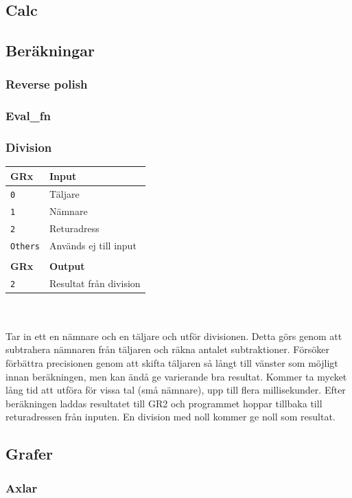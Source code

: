 \documentclass[]{article}
\begin{document}
\subsection{Calc}

\subsection{Beräkningar}
\subsubsection{Reverse polish}
\subsubsection{Eval\_fn}
\subsubsection{Division}
\begin{tabular}{ll}
	\textbf{GRx}    & \textbf{Input}         \\ \hline
	\texttt{0}      & Täljare                \\
	\texttt{1}      & Nämnare                \\
	\texttt{2}      & Returadress            \\
	\texttt{Others} & Används ej till input  \\
	                &  \\
	\textbf{GRx}    & \textbf{Output}        \\ \hline
	\texttt{2}      & Resultat från division
\end{tabular}
\\\\
\noindent
Tar in ett en nämnare och en täljare och utför divisionen. Detta görs genom att subtrahera nämnaren från täljaren och räkna antalet subtraktioner. Försöker förbättra precisionen genom att skifta täljaren så långt till vänster som möjligt innan beräkningen, men kan ändå ge varierande bra resultat. Kommer ta mycket lång tid att utföra för vissa tal (små nämnare), upp till flera millisekunder. Efter beräkningen laddas resultatet till GR2 och programmet hoppar tillbaka till returadressen från inputen. En division med noll kommer ge noll som resultat.

\subsection{Grafer}
\subsubsection{Axlar}
\end{document}
